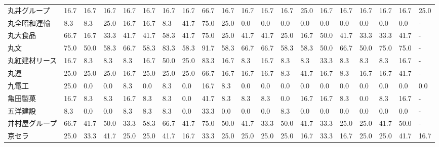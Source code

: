 \begin{tabular}{llllllllllllllllllll}
丸井グループ          &   16.7 &   16.7 &      16.7 &      16.7 &       16.7 &   16.7 &   16.7 &   66.7 &    16.7 &    16.7 &   16.7 &  16.7 &   25.0 &    16.7 &    16.7 &  16.7 &  16.7 &  16.7 &  25.0 \\
丸全昭和運輸          &    8.3 &    8.3 &      25.0 &      16.7 &       16.7 &    8.3 &   41.7 &   75.0 &    25.0 &     0.0 &    0.0 &   0.0 &    0.0 &     0.0 &     0.0 &   0.0 &   0.0 &   0.0 &     - \\
丸大食品            &   66.7 &   16.7 &      33.3 &      41.7 &       41.7 &   58.3 &   41.7 &   75.0 &    25.0 &    41.7 &   41.7 &  25.0 &   16.7 &    50.0 &    41.7 &  33.3 &  33.3 &  41.7 &     - \\
丸文              &   75.0 &   50.0 &      58.3 &      66.7 &       58.3 &   83.3 &   58.3 &   91.7 &    58.3 &    66.7 &   66.7 &  58.3 &   58.3 &    50.0 &    66.7 &  50.0 &  75.0 &  75.0 &     - \\
丸紅建材リース         &   16.7 &    8.3 &       8.3 &       8.3 &       16.7 &   50.0 &   25.0 &   83.3 &    16.7 &     8.3 &   16.7 &   8.3 &    8.3 &    33.3 &     8.3 &   8.3 &   8.3 &  16.7 &     - \\
丸運              &   25.0 &   25.0 &      25.0 &      16.7 &       25.0 &   25.0 &   25.0 &   66.7 &    16.7 &    16.7 &   16.7 &   8.3 &   41.7 &    16.7 &     8.3 &  16.7 &  16.7 &  41.7 &     - \\
九電工             &   25.0 &    0.0 &       0.0 &       8.3 &        0.0 &    8.3 &    0.0 &   16.7 &     8.3 &     0.0 &    0.0 &   0.0 &    0.0 &     0.0 &     0.0 &   0.0 &   0.0 &   0.0 &   0.0 \\
亀田製菓            &   16.7 &    8.3 &       8.3 &      16.7 &        8.3 &    8.3 &    0.0 &   41.7 &     8.3 &     8.3 &    8.3 &   0.0 &   16.7 &    16.7 &     8.3 &   0.0 &   8.3 &  16.7 &     - \\
五洋建設            &    8.3 &    0.0 &       0.0 &       8.3 &        8.3 &    8.3 &    0.0 &   33.3 &     0.0 &     0.0 &    0.0 &   8.3 &    0.0 &     0.0 &     0.0 &   0.0 &   0.0 &   0.0 &     - \\
井村屋グループ         &   66.7 &   41.7 &      50.0 &      33.3 &       58.3 &   66.7 &   41.7 &   75.0 &    50.0 &    41.7 &   33.3 &  50.0 &   41.7 &    33.3 &    25.0 &  25.0 &  41.7 &  50.0 &     - \\
京セラ             &   25.0 &   33.3 &      41.7 &      25.0 &       25.0 &   41.7 &   16.7 &   33.3 &    25.0 &    25.0 &   25.0 &  25.0 &   16.7 &    33.3 &    16.7 &  25.0 &  25.0 &  41.7 &  16.7 \\

\end{tabular}
